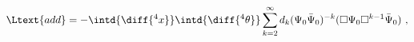 \begin{equation}
  \label{eq:addlag2}
  \Ltext{add} = - \intd{\diff{^4x}} \intd{\diff{^4 \theta}} \sum_{k =2}^{\infty} d_k (\Psi_0
  \bar{\Psi}_0)^{-k} (\Box \Psi_0 \Box^{k-1}
  \bar{\Psi}_0)\ ,
\end{equation}

